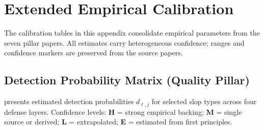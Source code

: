 

\section{Extended Empirical Calibration}
\label{app:calibration}

The calibration tables in this appendix consolidate empirical parameters
from the seven pillar papers. All estimates carry heterogeneous confidence;
ranges and confidence markers are preserved from the source papers.

\subsection{Detection Probability Matrix (Quality Pillar)}
\label{app:detection-matrix}

 presents estimated detection probabilities
$d_{\ell,j}$ for selected slop types across four defense layers.
Confidence levels: \textbf{H} = strong empirical backing;
\textbf{M} = single source or derived; \textbf{L} = extrapolated;
\textbf{E} = estimated from first principles.

